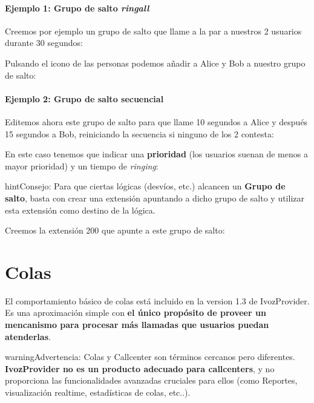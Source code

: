 \documentclass[letterpaper,10pt,spanish]{sphinxmanual}
\begin{document}
\paragraph{Ejemplo 1: Grupo de salto \emph{ringall}}

Creemos por ejemplo un grupo de salto que llame a la par a nuestros 2 usuarios durante 30 segundos:

\noindent{}

Pulsando el icono de las personas podemos añadir a Alice y Bob a nuestro grupo de salto:

\noindent{}
\paragraph{Ejemplo 2: Grupo de salto secuencial}

Editemos ahora este grupo de salto para que llame 10 segundos a Alice y después 15 segundos a Bob, reiniciando la secuencia si ninguno de los 2 contesta:

\noindent{}

En este caso tenemos que indicar una \textbf{prioridad} (los usuarios suenan de menos a mayor prioridad) y un tiempo de \emph{ringing}:

\noindent{}

\begin{notice}{hint}{Consejo:}
Para que ciertas lógicas (desvíos, etc.) alcancen un \textbf{Grupo de salto}, basta con crear una extensión apuntando a dicho grupo de salto y utilizar esta extensión como destino de la lógica.
\end{notice}

Creemos la extensión 200 que apunte a este grupo de salto:

\noindent{}


\section{Colas}
\label{pbx_features/queues:queues}\label{pbx_features/queues::doc}
El comportamiento básico de colas está incluido en la version 1.3 de IvozProvider. Es una aproximación simple con \textbf{el único propósito de proveer un mencanismo para procesar más llamadas que usuarios puedan atenderlas}.

\begin{notice}{warning}{Advertencia:}
Colas y Callcenter son términos cercanos pero diferentes. \textbf{IvozProvider no es un producto adecuado para callcenters}, y no proporciona las funcionalidades avanzadas cruciales para ellos (como Reportes, visualización realtime, estadísticas de colas, etc..).
\end{notice}
\end{document}
